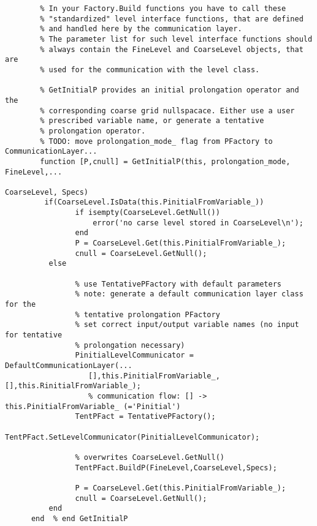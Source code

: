 \begin{verbatim}
        % In your Factory.Build functions you have to call these 
        % "standardized" level interface functions, that are defined
        % and handled here by the communication layer.
        % The parameter list for such level interface functions should 
        % always contain the FineLevel and CoarseLevel objects, that are
        % used for the communication with the level class.

        % GetInitialP provides an initial prolongation operator and the
        % corresponding coarse grid nullspacace. Either use a user
        % prescribed variable name, or generate a tentative
        % prolongation operator.
        % TODO: move prolongation_mode_ flag from PFactory to CommunicationLayer...
        function [P,cnull] = GetInitialP(this, prolongation_mode, FineLevel,...
                                                           CoarseLevel, Specs)
         if(CoarseLevel.IsData(this.PinitialFromVariable_))
                if isempty(CoarseLevel.GetNull())
                    error('no carse level stored in CoarseLevel\n');
                end
                P = CoarseLevel.Get(this.PinitialFromVariable_);
                cnull = CoarseLevel.GetNull();
          else

                % use TentativePFactory with default parameters 
                % note: generate a default communication layer class for the
                % tentative prolongation PFactory
                % set correct input/output variable names (no input for tentative
                % prolongation necessary)
                PinitialLevelCommunicator = DefaultCommunicationLayer(...
                   [],this.PinitialFromVariable_,[],this.RinitialFromVariable_); 
                   % communication flow: [] -> this.PinitialFromVariable_ (='Pinitial')
                TentPFact = TentativePFactory(); 
                TentPFact.SetLevelCommunicator(PinitialLevelCommunicator);

                % overwrites CoarseLevel.GetNull()
                TentPFact.BuildP(FineLevel,CoarseLevel,Specs);

                P = CoarseLevel.Get(this.PinitialFromVariable_);
                cnull = CoarseLevel.GetNull();
          end
      end  % end GetInitialP


\end{verbatim}
